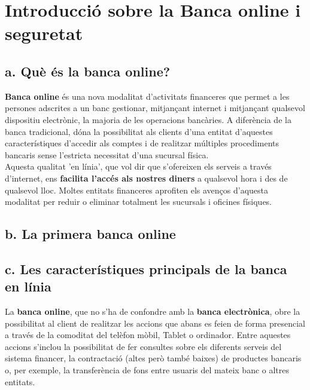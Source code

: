 \section{Introducció sobre la Banca online i seguretat}
\subsection*{a. Què és la banca online?}

\textbf{Banca online} és una nova modalitat d'activitats financeres que permet a les persones adscrites a un banc gestionar, mitjançant internet i mitjançant qualsevol dispositiu electrònic, la majoria de les operacions bancàries. A diferència de la banca tradicional, dóna la possibilitat als clients d'una entitat d'aquestes característiques d'accedir als comptes i de realitzar múltiples procediments bancaris sense l'estricta necessitat d'una sucursal física. \\



Aquesta qualitat 'en línia', que vol dir que s'ofereixen els serveis a través d'internet, ens \textbf{facilita l'accés als nostres diners} a qualsevol hora i des de qualsevol lloc. Moltes entitats financeres aprofiten els avenços d'aquesta modalitat per reduir o eliminar totalment les sucursals i oficines físiques.

\subsection*{b. La primera banca online}



\subsection*{c. Les característiques principals de la banca en línia}

La \textbf{banca online}, que no s'ha de confondre amb la \textbf{banca electrònica}, obre la possibilitat al client de realitzar les accions que abans es feien de forma presencial a través de la comoditat del telèfon mòbil, Tablet o ordinador. Entre aquestes accions s'inclou la possibilitat de fer consultes sobre els diferents serveis del sistema financer, la contractació (altes però també baixes) de productes bancaris o, per exemple, la transferència de fons entre usuaris del mateix banc o altres entitats.

